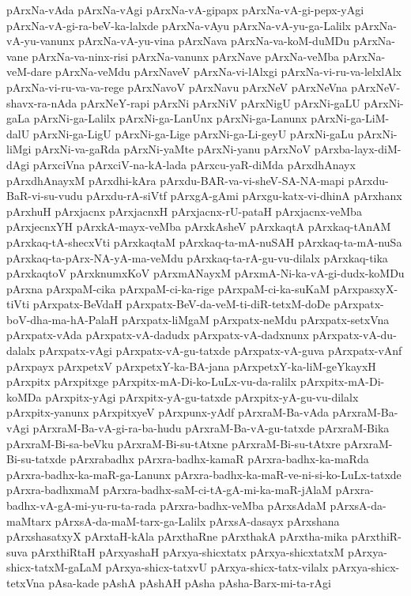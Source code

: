 {pArxNa-vAda
pArxNa-vAgi
pArxNa-vA-gipapx
pArxNa-vA-gi-pepx-yAgi
pArxNa-vA-gi-ra-beV-ka-lalxde
pArxNa-vAyu
pArxNa-vA-yu-ga-Lalilx
pArxNa-vA-yu-vanunx
pArxNa-vA-yu-vina
pArxNava
pArxNa-va-koM-duMDu
pArxNa-vane
pArxNa-va-ninx-risi
pArxNa-vanunx
pArxNave
pArxNa-veMba
pArxNa-veM-dare
pArxNa-veMdu
pArxNaveV
pArxNa-vi-lAlxgi
pArxNa-vi-ru-va-lelxlAlx
pArxNa-vi-ru-va-va-rege
pArxNavoV
pArxNavu
pArxNeV
pArxNeVna
pArxNeV-shavx-ra-nAda
pArxNeY-rapi
pArxNi
pArxNiV
pArxNigU
pArxNi-gaLU
pArxNi-gaLa
pArxNi-ga-Lalilx
pArxNi-ga-LanUnx
pArxNi-ga-Lanunx
pArxNi-ga-LiM-dalU
pArxNi-ga-LigU
pArxNi-ga-Lige
pArxNi-ga-Li-geyU
pArxNi-gaLu
pArxNi-liMgi
pArxNi-va-gaRda
pArxNi-yaMte
pArxNi-yanu
pArxNoV
pArxba-layx-diM-dAgi
pArxciVna
pArxciV-na-kA-lada
pArxcu-yaR-diMda
pArxdhAnayx
pArxdhAnayxM
pArxdhi-kAra
pArxdu-BAR-va-vi-sheV-SA-NA-mapi
pArxdu-BaR-vi-su-vudu
pArxdu-rA-siVtf
pArxgA-gAmi
pArxgu-katx-vi-dhinA
pArxhanx
pArxhuH
pArxjacnx
pArxjacnxH
pArxjacnx-rU-pataH
pArxjacnx-veMba
pArxjecnxYH
pArxkA-mayx-veMba
pArxkAsheV
pArxkaqtA
pArxkaq-tAnAM
pArxkaq-tA-shecxVti
pArxkaqtaM
pArxkaq-ta-mA-nuSAH
pArxkaq-ta-mA-nuSa
pArxkaq-ta-pArx-NA-yA-ma-veMdu
pArxkaq-ta-rA-gu-vu-dilalx
pArxkaq-tika
pArxkaqtoV
pArxknumxKoV
pArxmANayxM
pArxmA-Ni-ka-vA-gi-dudx-koMDu
pArxna
pArxpaM-cika
pArxpaM-ci-ka-rige
pArxpaM-ci-ka-suKaM
pArxpasxyX-tiVti
pArxpatx-BeVdaH
pArxpatx-BeV-da-veM-ti-diR-tetxM-doDe
pArxpatx-boV-dha-ma-hA-PalaH
pArxpatx-liMgaM
pArxpatx-neMdu
pArxpatx-setxVna
pArxpatx-vAda
pArxpatx-vA-dadudx
pArxpatx-vA-dadxnunx
pArxpatx-vA-du-dalalx
pArxpatx-vAgi
pArxpatx-vA-gu-tatxde
pArxpatx-vA-guva
pArxpatx-vAnf
pArxpayx
pArxpetxV
pArxpetxY-ka-BA-jana
pArxpetxY-ka-liM-geYkayxH
pArxpitx
pArxpitxge
pArxpitx-mA-Di-ko-LuLx-vu-da-ralilx
pArxpitx-mA-Di-koMDa
pArxpitx-yAgi
pArxpitx-yA-gu-tatxde
pArxpitx-yA-gu-vu-dilalx
pArxpitx-yanunx
pArxpitxyeV
pArxpunx-yAdf
pArxraM-Ba-vAda
pArxraM-Ba-vAgi
pArxraM-Ba-vA-gi-ra-ba-hudu
pArxraM-Ba-vA-gu-tatxde
pArxraM-Bika
pArxraM-Bi-sa-beVku
pArxraM-Bi-su-tAtxne
pArxraM-Bi-su-tAtxre
pArxraM-Bi-su-tatxde
pArxrabadhx
pArxra-badhx-kamaR
pArxra-badhx-ka-maRda
pArxra-badhx-ka-maR-ga-Lanunx
pArxra-badhx-ka-maR-ve-ni-si-ko-LuLx-tatxde
pArxra-badhxmaM
pArxra-badhx-saM-ci-tA-gA-mi-ka-maR-jAlaM
pArxra-badhx-vA-gA-mi-yu-ru-ta-rada
pArxra-badhx-veMba
pArxsAdaM
pArxsA-da-maMtarx
pArxsA-da-maM-tarx-ga-Lalilx
pArxsA-dasayx
pArxshana
pArxshasatxyX
pArxtaH-kAla
pArxthaRne
pArxthakA
pArxtha-mika
pArxthiR-suva
pArxthiRtaH
pArxyashaH
pArxya-shicxtatx
pArxya-shicxtatxM
pArxya-shicx-tatxM-gaLaM
pArxya-shicx-tatxvU
pArxya-shicx-tatx-vilalx
pArxya-shicx-tetxVna
pAsa-kade
pAshA
pAshAH
pAsha
pAsha-Barx-mi-ta-rAgi
}
